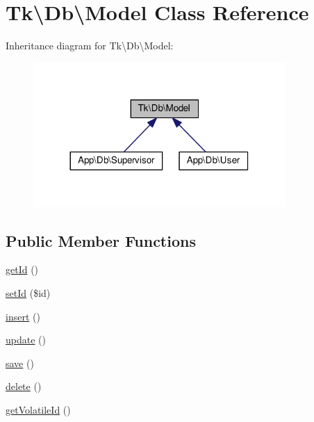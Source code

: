 \hypertarget{classTk_1_1Db_1_1Model}{\section{Tk\textbackslash{}Db\textbackslash{}Model Class Reference}
\label{classTk_1_1Db_1_1Model}
}


Inheritance diagram for Tk\textbackslash{}Db\textbackslash{}Model\+:\nopagebreak
\begin{figure}[H]
\begin{center}
\leavevmode
\includegraphics[width=272pt]{classTk_1_1Db_1_1Model__inherit__graph}
\end{center}
\end{figure}
\subsection*{Public Member Functions}
\begin{DoxyCompactItemize}
\item 
\hyperlink{classTk_1_1Db_1_1Model_af75537c54b500f4e67b0936bc7effb03}{get\+Id} ()
\item 
\hyperlink{classTk_1_1Db_1_1Model_af0226ad1978b312105d454e06de36dbd}{set\+Id} (\$id)
\item 
\hyperlink{classTk_1_1Db_1_1Model_a4c20c888c910ea6ee7db5ee48bf57a02}{insert} ()
\item 
\hyperlink{classTk_1_1Db_1_1Model_a4e1cb342ed10dba3a68dd8c10ee29fbd}{update} ()
\item 
\hyperlink{classTk_1_1Db_1_1Model_a31c4438e7e3538e511dd64173a0ee6da}{save} ()
\item 
\hyperlink{classTk_1_1Db_1_1Model_a8913ea94f4f637dd8ea1392e8e8fb326}{delete} ()
\item 
\hyperlink{classTk_1_1Db_1_1Model_ab0a0d66e9ab444f003694053349fedfc}{get\+Volatile\+Id} ()
\end{DoxyCompactItemize}
